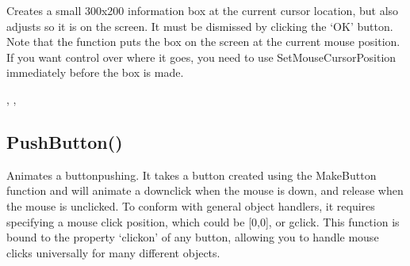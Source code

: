 \documentclass[letterpaper,10pt,english]{sphinxmanual}
\begin{document}
\sphinxAtStartPar
{}

\sphinxAtStartPar
Creates a small 300x200 information box at the current cursor location, but also adjusts so it is on the screen. It must be dismissed by clicking the ‘OK’ button. Note that the function puts the box on the screen at the current mouse position. If you want control over where it goes, you need to use SetMouseCursorPosition immediately before the box is made.

\sphinxAtStartPar
{}

\begin{sphinxVerbatim}[commandchars=\\\{\}]
\end{sphinxVerbatim}

\sphinxAtStartPar
{}

\begin{sphinxVerbatim}[commandchars=\\\{\}]
\end{sphinxVerbatim}

\sphinxAtStartPar
{}

\sphinxAtStartPar
{}, , 

\ignorespaces 

\subsection{PushButton()}
\label{\detokenize{reference/ui:pushbutton}}\label{\detokenize{reference/ui:index-25}}
\sphinxAtStartPar
{}

\sphinxAtStartPar
{}

\sphinxAtStartPar
Animates a button\sphinxhyphen{}pushing. It takes a button created using the MakeButton function and will animate a downclick when the mouse is down, and release when the mouse is unclicked.  To conform with general object handlers, it requires specifying a mouse click position, which could be {[}0,0{]}, or gclick. This function is bound to the property ‘clickon’ of any button, allowing you to handle mouse clicks universally for many different objects.
\end{document}
